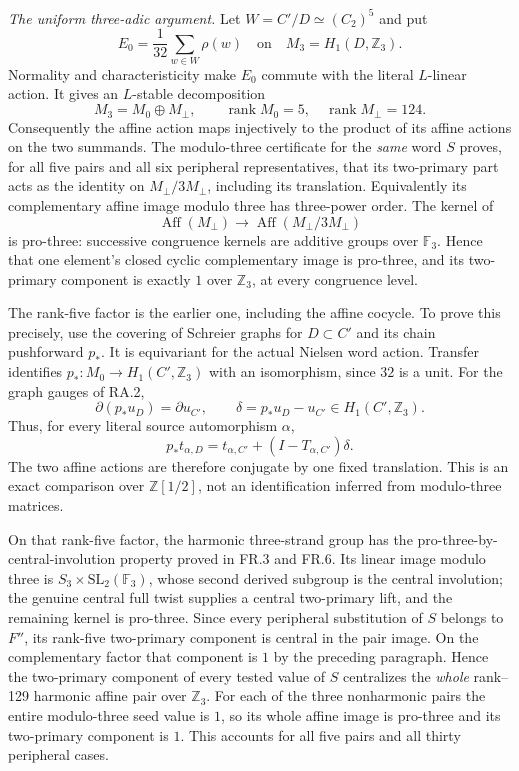 \emph{The uniform three-adic argument.}
Let $W=C'/D\simeq(C_2)^5$ and put
\[
 E_0=\frac1{32}\sum_{w\in W}\rho(w)
 \quad\text{on}\quad M_3=H_1(D,\mathbb Z_3).
\]
Normality and characteristicity make $E_0$ commute
with the literal $L$-linear action.  It gives an
$L$-stable decomposition
\[
 M_3=M_0\oplus M_\perp,
 \qquad \operatorname{rank}M_0=5,
 \quad\operatorname{rank}M_\perp=124.
\]
Consequently the affine action maps injectively to
the product of its affine actions on the two summands.
The modulo-three certificate for the \emph{same} word
$S$ proves, for all five pairs and all six peripheral
representatives, that its two-primary part acts as the
identity on $M_\perp/3M_\perp$, including its translation.
Equivalently its complementary affine image modulo three
has three-power order.  The kernel of
\[
 \operatorname{Aff}(M_\perp)\longrightarrow
 \operatorname{Aff}(M_\perp/3M_\perp)
\]
is pro-three: successive congruence kernels are additive
groups over $\mathbb F_3$.  Hence that one element's
closed cyclic complementary image is pro-three, and
its two-primary component is exactly $1$ over
$\mathbb Z_3$, at every congruence level.

The rank-five factor is the earlier one, including the
affine cocycle.  To prove this precisely, use the
covering of Schreier graphs for $D\subset C'$ and its
chain pushforward $p_*$.  It is equivariant for the
actual Nielsen word action.  Transfer identifies
$p_*:M_0\to H_1(C',\mathbb Z_3)$ with an isomorphism,
since $32$ is a unit.  For the graph gauges of RA.2,
\[
 \partial(p_*u_D)=\partial u_{C'},\qquad
 \delta=p_*u_D-u_{C'}\in H_1(C',\mathbb Z_3).
\]
Thus, for every literal source automorphism $\alpha$,
\[
 p_*t_{\alpha,D}
   =t_{\alpha,C'}+(I-T_{\alpha,C'})\delta.
\]
The two affine actions are therefore conjugate by one
fixed translation.  This is an exact comparison over
$\mathbb Z[1/2]$, not an identification inferred from
modulo-three matrices.

On that rank-five factor, the harmonic three-strand
group has the pro-three-by-central-involution property
proved in FR.3 and FR.6.  Its linear image modulo
three is $S_3\times\mathrm{SL}_2(\mathbb F_3)$, whose
second derived subgroup is the central involution;
the genuine central full twist supplies a central
two-primary lift, and the remaining kernel is
pro-three.  Since every peripheral substitution of
$S$ belongs to $F''$, its rank-five two-primary
component is central in the pair image.  On the
complementary factor that component is $1$ by the
preceding paragraph.  Hence the two-primary component
of every tested value of $S$ centralizes the \emph{whole}
rank--129 harmonic affine pair over $\mathbb Z_3$.
For each of the three nonharmonic pairs the entire
modulo-three seed value is $1$, so its whole affine
image is pro-three and its two-primary component is
$1$.  This accounts for all five pairs and all thirty
peripheral cases.

